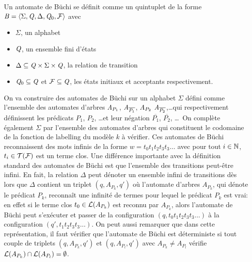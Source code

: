 \begin{definition}
  Un automate de Büchi se définit comme un quintuplet de la forme $\mathit B = \langle \Sigma, \mathit Q, \Delta, \mathit Q_0, \mathcal{F}\rangle$
  avec
  \begin{itemize}
  \item $\Sigma$, un alphabet
  \item $\mathit Q$, un ensemble fini d'états 
  \item $\Delta \subseteq \mathit Q \times \Sigma \times \mathit Q$, la relation de transition
  \item $\mathit Q_0 \subseteq \mathit Q$ et $\mathcal{F} \subseteq \mathit Q$, les états initiaux et acceptants respectivement.
  \end{itemize}
\end{definition}
On va construire des automates de Büchi sur un alphabet $\Sigma$ défini comme l'ensemble des automates 
d'arbres $\mathit A_{P_1}$, $\mathit A_{\overline{P_1}}$, $\mathit A_{P_2}$ $\mathit A_{\overline{P_2}}$,\dots qui respectivement définissent 
les prédicats $P_1$, $P_2$, \dots et leur négation $\overline{P_1}$, $\overline{P_2}$, \dots\ 
On complète également $\Sigma$ par l'ensemble des automates d'arbres qui constituent le codomaine 
de la fonction de labelling du modèle $k$ à vérifier.
Ces automates de Büchi reconnaissent des mots infinis de la forme $w = t_0t_1t_2t_3t_3\dots$ avec pour tout 
$i \in \mathbb N$, $t_i \in \mathcal{T(F)}$ est un terme clos. Une différence importante avec la définition standard des automates
de Büchi est que l'ensemble des transitions peut-être infini.
En fait, la relation $\Delta$ peut dénoter 
un ensemble infini de transitions dès lors que $\Delta$ contient un triplet $(q, A_{P_k}, q')$
où l'automate d'arbres $A_{P_k}$, qui dénote le prédicat $P_k$, reconnaît une infinité de termes 
pour lequel le prédicat $P_k$ est vrai: en effet si le terme clos $t_0 \in \mathcal{L}(A_{P_k})$ est 
reconnu par $A_{P_k}$, alors l'automate de Büchi peut s'exécuter et passer de la configuration
$(q,t_0t_1t_2t_3t_3\dots)$ à la configuration $(q',t_1t_2t_3t_3\dots)$. On peut aussi remarquer
que dans cette représentation, il faut vérifier que l'automate de Büchi est déterministe si
tout couple de triplets $(q, A_{P_k}, q')$ et $(q, A_{P_l}, q')$ avec $A_{P_k} \not= A_{P_l}$
vérifie $\mathcal{L}(A_{P_k}) \cap \mathcal{L}(A_{P_l}) = \emptyset$.



